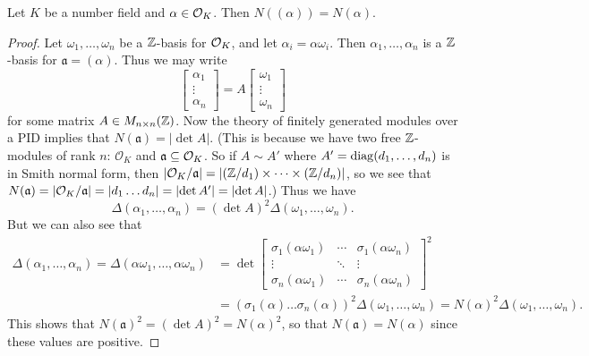 \begin{theorem}
  Let $K$ be a number field and $\alpha \in \mathcal{O}_K$.
  Then $N((\alpha)) = N(\alpha)$.
\end{theorem}

\begin{proof}
  Let $\omega_1, \dots, \omega_n$ be a $\mathbb{Z}$-basis for
  $\mathcal{O}_K$, and let
  $\alpha_i = \alpha \omega_i$. Then
  $\alpha_1, \dots, \alpha_n$ is a $\mathbb{Z}$-basis for
  $\mathfrak{a} = (\alpha)$. Thus we may write
  \[
    \begin{bmatrix}
      \alpha_1 \\ \vdots \\ \alpha_n
    \end{bmatrix}
    = A
    \begin{bmatrix}
      \omega_1 \\ \vdots \\ \omega_n
    \end{bmatrix}
  \]
  for some matrix $A \in M_{n \times n}(\mathbb{Z})$.
  Now the theory of finitely generated modules over
  a PID implies that $N(\mathfrak{a}) = |{\det A}|$. (This
  is because we have two free $\mathbb{Z}$-modules of
  rank $n$: $\mathcal{O}_K$ and $\mathfrak{a} \subseteq \mathcal{O}_K$. So if $A \sim A'$ where $A' = \operatorname{diag}(d_1, \dots, d_n)$ is in Smith normal form, then
  $|\mathcal{O}_K / \mathfrak{a}| = |(\mathbb{Z} / d_1) \times \dots \times (\mathbb{Z} / d_n)|$, so we see that
  $N(\mathfrak{a}) = |\mathcal{O}_K / \mathfrak{a}| = |d_1 \dots d_n| = |{\det A'}| = |{\det A}|$.)
  Thus we have
  \[
    \Delta(\alpha_1, \dots, \alpha_n)
    = (\det A)^2 \Delta(\omega_1, \dots, \omega_n).
  \]
  But we can also see that
  \begin{align*}
    \Delta(\alpha_1, \dots, \alpha_n)
    = \Delta(\alpha \omega_1, \dots, \alpha \omega_n)
    &= \det
    \begin{bmatrix}
      \sigma_1(\alpha \omega_1) & \cdots & \sigma_1(\alpha \omega_n) \\
      \vdots & \ddots & \vdots \\
      \sigma_n(\alpha \omega_1) & \cdots & \sigma_n(\alpha \omega_n)
    \end{bmatrix}^2 \\
    &= (\sigma_1(\alpha) \dots \sigma_n(\alpha))^2 \Delta(\omega_1, \dots, \omega_n)
    = N(\alpha)^2 \Delta(\omega_1, \dots, \omega_n).
  \end{align*}
  This shows that $N(\mathfrak{a})^2 = (\det A)^2 = N(\alpha)^2$,
  so that $N(\mathfrak{a}) = N(\alpha)$
  since these values are positive.
\end{proof}
